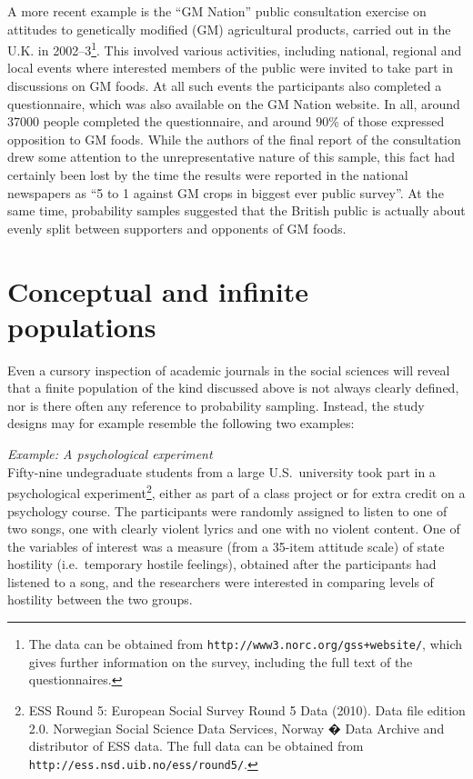 \documentclass[11pt,a4paper,openany]{book}
\let\rmarkdownfootnote\footnote%
\def\footnote{\protect\rmarkdownfootnote}
\begin{document}
A more recent example is the ``GM Nation'' public consultation exercise
on attitudes to genetically modified (GM) agricultural products, carried
out in the U.K. in 2002--3\footnote{The data can be obtained from
  \texttt{http://www3.norc.org/gss+website/}, which gives further
  information on the survey, including the full text of the
  questionnaires.}. This involved various activities, including
national, regional and local events where interested members of the
public were invited to take part in discussions on GM foods. At all such
events the participants also completed a questionnaire, which was also
available on the GM Nation website. In all, around 37000 people
completed the questionnaire, and around 90\% of those expressed
opposition to GM foods. While the authors of the final report of the
consultation drew some attention to the unrepresentative nature of this
sample, this fact had certainly been lost by the time the results were
reported in the national newspapers as ``5 to 1 against GM crops in
biggest ever public survey''. At the same time, probability samples
suggested that the British public is actually about evenly split between
supporters and opponents of GM foods.

\section{Conceptual and infinite populations}\label{s-samples-infpops}

Even a cursory inspection of academic journals in the social sciences
will reveal that a finite population of the kind discussed above is not
always clearly defined, nor is there often any reference to probability
sampling. Instead, the study designs may for example resemble the
following two examples:

\emph{Example: A psychological experiment}\\
Fifty-nine undegraduate students from a large U.S.~university took part
in a psychological experiment\footnote{ESS Round 5: European Social
  Survey Round 5 Data (2010). Data file edition 2.0. Norwegian Social
  Science Data Services, Norway � Data Archive and distributor of ESS
  data. The full data can be obtained from
  \texttt{http://ess.nsd.uib.no/ess/round5/}.}, either as part of a
class project or for extra credit on a psychology course. The
participants were randomly assigned to listen to one of two songs, one
with clearly violent lyrics and one with no violent content. One of the
variables of interest was a measure (from a 35-item attitude scale) of
state hostility (i.e.~temporary hostile feelings), obtained after the
participants had listened to a song, and the researchers were interested
in comparing levels of hostility between the two groups.
\end{document}
